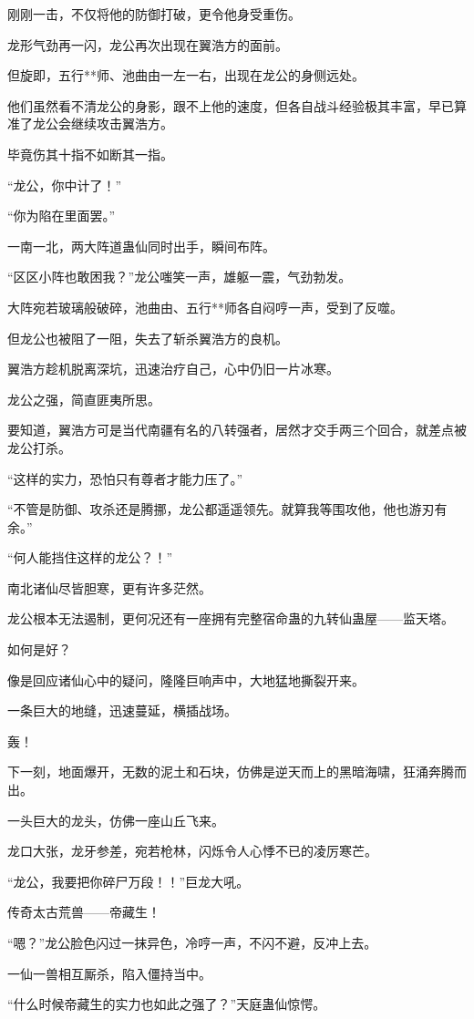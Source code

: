 \begin{this_body}
刚刚一击，不仅将他的防御打破，更令他身受重伤。

龙形气劲再一闪，龙公再次出现在翼浩方的面前。

但旋即，五行**师、池曲由一左一右，出现在龙公的身侧远处。

他们虽然看不清龙公的身影，跟不上他的速度，但各自战斗经验极其丰富，早已算准了龙公会继续攻击翼浩方。

毕竟伤其十指不如断其一指。

“龙公，你中计了！”

“你为陷在里面罢。”

一南一北，两大阵道蛊仙同时出手，瞬间布阵。

“区区小阵也敢困我？”龙公嗤笑一声，雄躯一震，气劲勃发。

大阵宛若玻璃般破碎，池曲由、五行**师各自闷哼一声，受到了反噬。

但龙公也被阻了一阻，失去了斩杀翼浩方的良机。

翼浩方趁机脱离深坑，迅速治疗自己，心中仍旧一片冰寒。

龙公之强，简直匪夷所思。

要知道，翼浩方可是当代南疆有名的八转强者，居然才交手两三个回合，就差点被龙公打杀。

“这样的实力，恐怕只有尊者才能力压了。”

“不管是防御、攻杀还是腾挪，龙公都遥遥领先。就算我等围攻他，他也游刃有余。”

“何人能挡住这样的龙公？！”

南北诸仙尽皆胆寒，更有许多茫然。

龙公根本无法遏制，更何况还有一座拥有完整宿命蛊的九转仙蛊屋——监天塔。

如何是好？

像是回应诸仙心中的疑问，隆隆巨响声中，大地猛地撕裂开来。

一条巨大的地缝，迅速蔓延，横插战场。

轰！

下一刻，地面爆开，无数的泥土和石块，仿佛是逆天而上的黑暗海啸，狂涌奔腾而出。

一头巨大的龙头，仿佛一座山丘飞来。

龙口大张，龙牙参差，宛若枪林，闪烁令人心悸不已的凌厉寒芒。

“龙公，我要把你碎尸万段！！”巨龙大吼。

传奇太古荒兽——帝藏生！

“嗯？”龙公脸色闪过一抹异色，冷哼一声，不闪不避，反冲上去。

一仙一兽相互厮杀，陷入僵持当中。

“什么时候帝藏生的实力也如此之强了？”天庭蛊仙惊愕。


\end{this_body}
